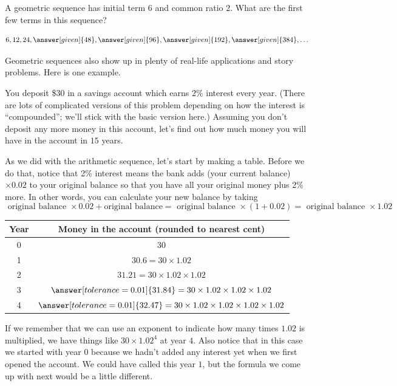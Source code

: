 \documentclass{ximera}
\begin{document}
\begin{question}
A geometric sequence has initial term $6$ and common ratio $2$. What are the first few terms in this sequence?
\begin{prompt}
\[
6, 12, 24, \answer[given]{48}, \answer[given]{96}, \answer[given]{192}, \answer[given]{384}, \dots
\]
\end{prompt}
\end{question}
Geometric sequences also show up in plenty of real-life applications and story problems. Here is one example.
\begin{example}
You deposit \$30 in a savings account which earns $2\%$ interest every year. (There are lots of complicated versions of this problem depending on how the interest is ``compounded''; we'll stick with the basic version here.) Assuming you don't deposit any more money in this account, let's find out how much money you will have in the account in $15$ years. 

As we did with the arithmetic sequence, let's start by making a table. Before we do that, notice that 2\% interest means the bank adds (your current balance) $\times 0.02$ to your original balance so that you have all your original money plus 2\% more. In other words, you can calculate your new balance by taking
\[
\textrm{ original balance } \times 0.02 + \textrm{original balance} = \textrm{ original balance } \times (1 + 0.02) = \textrm{ original balance } \times 1.02
\]
\begin{image}
\begin{tabular}{c|c}
Year & Money in the account (rounded to nearest cent) \\ \hline
0 & 30 \\ \hline
1 & $ 30.6 = 30 \times 1.02$ \\ \hline
2 & $31.21 = 30 \times 1.02 \times 1.02$ \\ \hline
3 & $\answer[tolerance=0.01]{31.84} = 30 \times 1.02 \times 1.02 \times 1.02$ \\ \hline
4 & $\answer[tolerance=0.01]{32.47} = 30 \times 1.02 \times 1.02 \times 1.02 \times 1.02$ \\ \hline
\end{tabular}
\end{image}
If we remember that we can use an exponent to indicate how many times $1.02$ is multiplied, we have things like $30 \times 1.02^4$ at year $4$. Also notice that in this case we started with year $0$ because we hadn't added any interest yet when we first opened the account. We could have called this year $1$, but the formula we come up with next would be a little different.


\end{example}
\end{document}
